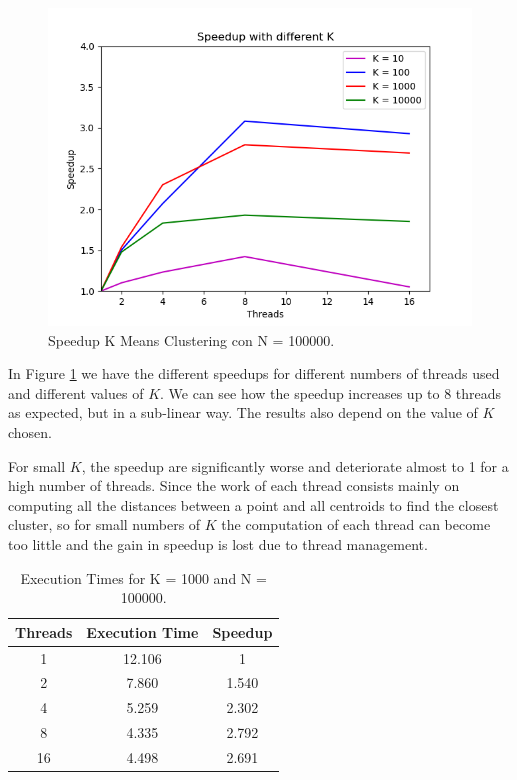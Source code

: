 \documentclass[10pt,twocolumn,letterpaper]{article}
\begin{document}
\begin{figure}[H]
	\includegraphics[width=\linewidth]{images/speedup_by_k.png}
	\caption{Speedup K Means Clustering con N = 100000.}
	\label{fig:speedup_k}
\end{figure}

In Figure \ref{fig:speedup_k} we have the different speedups for different numbers of threads used and different values of $K$. We can see how the speedup increases up to 8 threads as expected, but in a sub-linear way.
The results also depend on the value of $K$ chosen. 

For small $K$, the speedup are significantly worse and deteriorate almost to 1 for a high number of threads. Since the work of each thread consists mainly on computing all the distances between a point and all centroids to find the closest cluster, so for small numbers of $K$ the computation of each thread can become too little and the gain in speedup is lost due to thread management.


\begin{table}
\begin{center}
\begin{tabular}{|c|c|c|}
\hline
Threads & Execution Time & Speedup \\
\hline
1 & 12.106 & 1 \\ 
2 & 7.860 & 1.540 \\
4 & 5.259 & 2.302 \\
8 & 4.335 & 2.792 \\ 
16 & 4.498 & 2.691 \\
\hline
\end{tabular}
\end{center}
\caption{Execution Times for K = 1000 and N = 100000.}
\label{tab:speedup_k_n}
\end{table}
\end{document}
